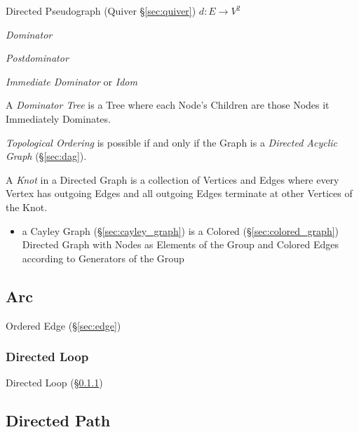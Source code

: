 Directed Pseudograph (Quiver \S\ref{sec:quiver}) $d : E \rightarrow
V^2$



\emph{Dominator}

\emph{Postdominator}

\emph{Immediate Dominator} or \emph{Idom}

A \emph{Dominator Tree} is a Tree where each Node's Children are those
Nodes it Immediately Dominates.

\emph{Topological Ordering} is possible if and only if the Graph is a
\emph{Directed Acyclic Graph} (\S\ref{sec:dag}).

A \emph{Knot} in a Directed Graph is a collection of Vertices and
Edges where every Vertex has outgoing Edges and all outgoing Edges
terminate at other Vertices of the Knot.

\begin{itemize}
  \item a Cayley Graph (\S\ref{sec:cayley_graph}) is a Colored
    (\S\ref{sec:colored_graph}) Directed Graph with Nodes as Elements of the
    Group and Colored Edges according to Generators of the Group
\end{itemize}



\subsection{Arc}\label{sec:arc}

Ordered Edge (\S\ref{sec:edge})



\subsubsection{Directed Loop}\label{sec:directed_loop}

Directed Loop (\S\ref{sec:directed_loop})



\subsection{Directed Path}\label{sec:directed_path}


